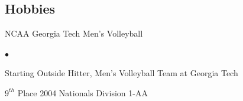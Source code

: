 \documentclass[line,margin,10pt]{res}
\newenvironment{list2}{
	\begin{list}{$\bullet$}{
		\setlength{\itemsep}{0in}
		\setlength{\parsep}{0in}
		\setlength{\parskip}{0in}
		\setlength{\topsep}{0in}
		\setlength{\partopsep}{0in}
		\setlength{\leftmargin}{0.2in}}}
		{\end{list}}
\begin{document}
\begin{resume}
\restartnumbering


\restartnumbering


\restartnumbering









\section{\sc Hobbies}
NCAA Georgia Tech Men's Volleyball
\begin{list2}
\item Starting Outside Hitter, Men's Volleyball Team at Georgia Tech
\item $9^{th}$ Place 2004 Nationals Division 1-AA
\end{list2}

\end{resume}
\end{document}
